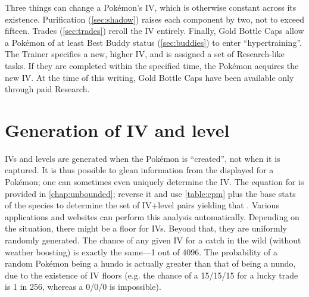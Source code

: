 Three things can change a Pokémon's IV, which is otherwise constant across its existence.
Purification (\autoref{sec:shadow}) raises each component by two, not to exceed fifteen.
Trades (\autoref{sec:trades}) reroll the IV entirely.
Finally, Gold Bottle Caps allow a Pokémon of at least Best Buddy status (\autoref{sec:buddies}) 
  to enter ``hypertraining''.
The Trainer specifies a new, higher IV, and is assigned a set of Research-like tasks.
If they are completed within the specified time, the Pokémon acquires the new IV.
At the time of this writing, Gold Bottle Caps have been available only through paid Research.

\section{Generation of IV and level\label{sec:ivgeneration}}
IVs and levels are generated when the Pokémon is ``created'', not when it is captured.
It is thus possible to glean information from the \CP{} displayed for a Pokémon;
  one can sometimes even uniquely determine the IV\@.
The equation for \CP{} is provided in \autoref{chap:unbounded}; reverse it and
  use \autoref{table:cpm} plus the base stats of the species to determine
  the set of IV+level pairs yielding that \CP\@.
Various applications and websites can perform this analysis automatically.
Depending on the situation, there might be a floor for IVs.
Beyond that, they are uniformly randomly generated.
The chance of any given IV for a catch in the wild (without weather boosting)
  is exactly the same---1 out of 4096.
The probability of a random Pokémon being a hundo is actually
  greater than that of being a nundo, due to the existence of IV floors
  (e.g. the chance of a 15/15/15 for a lucky trade is 1 in 256, whereas
  a 0/0/0 is impossible).
